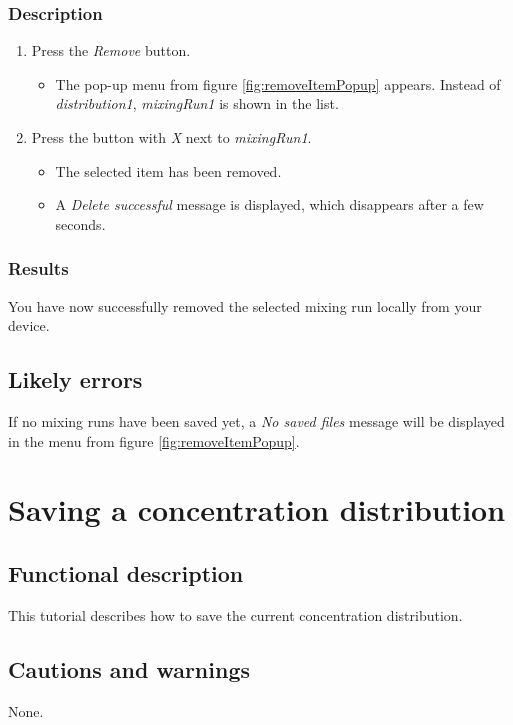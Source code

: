 \subsubsection{Description}
\begin{enumerate}
	\item Press the \emph{Remove} button.
		\begin{itemize}
			\item The pop-up menu from figure \ref{fig:removeItemPopup} appears. Instead of \emph{distribution1}, \emph{mixingRun1} is shown in the list.
		\end{itemize}
	\item Press the button with \emph{X} next to \emph{mixingRun1}.
		\begin{itemize}
			\item The selected item has been removed.
			\item A \emph{Delete successful} message is displayed, which disappears after a few seconds.
		\end{itemize}
\end{enumerate}

\subsubsection{Results}
You have now successfully removed the selected mixing run locally from your device.

\subsection{Likely errors}
If no mixing runs have been saved yet, a \emph{No saved files} message will be displayed in the menu from figure \ref{fig:removeItemPopup}.


\section{Saving a concentration distribution}\label{sec:savdist}

\subsection{Functional description}
This tutorial describes how to save the current concentration distribution.

\subsection{Cautions and warnings}
None.

